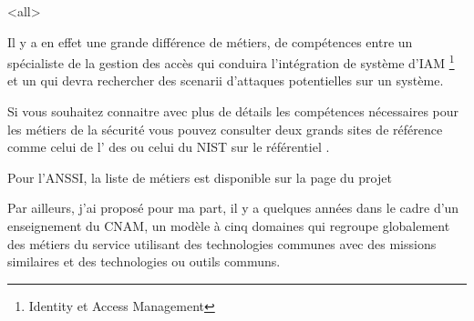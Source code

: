 \mode<all>{}



Il y a en effet une grande différence de métiers, de compétences entre un spécialiste de la gestion des accès  qui conduira l'intégration de système d'IAM  \footnote{Identity et Access Management} et un  qui devra rechercher des scenarii d'attaques potentielles sur un système. 






Si vous souhaitez connaitre avec plus de détails les compétences nécessaires pour les métiers de la sécurité vous pouvez consulter deux grands sites de référence comme celui de l' des 
  ou celui du NIST sur le référentiel  .
 
 Pour l'ANSSI, la liste de métiers est disponible sur la page du projet 
 
Par ailleurs,  j'ai proposé pour ma part, il y a quelques années dans le cadre d'un enseignement du CNAM, un modèle à cinq domaines qui regroupe globalement des métiers du service utilisant des technologies communes avec des  missions similaires et des technologies ou outils communs.
 
